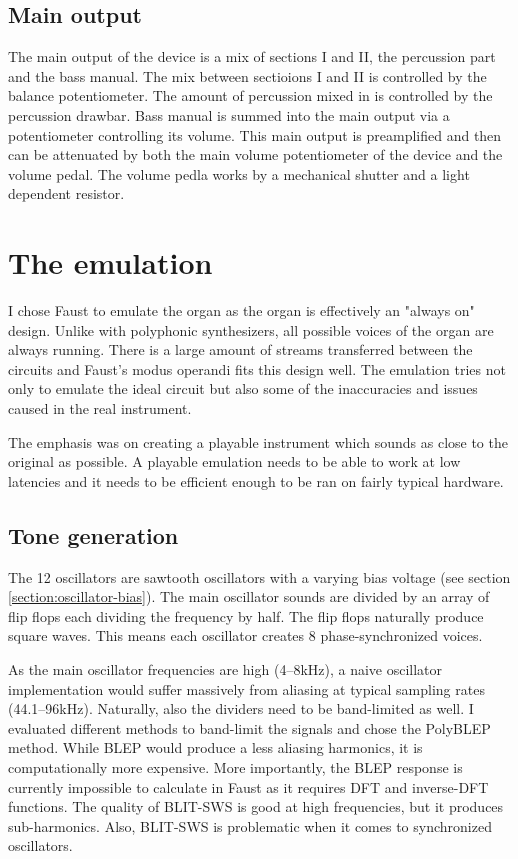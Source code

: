 \documentclass[11pt,a4paper]{article}
\begin{document}

\subsection{Main output}

The main output of the device is a mix of sections I and II, the percussion part and the bass manual. The mix between sectioions I and II is controlled by the balance potentiometer. The amount of percussion mixed in is controlled by the percussion drawbar. Bass manual is summed into the main output via a potentiometer controlling its volume. This main output is preamplified and then can be attenuated by both the main volume potentiometer of the device and the volume pedal. The volume pedla works by a mechanical shutter and a light dependent resistor.

\section{The emulation} 

I chose Faust to emulate the organ as the organ is effectively an "always on" design. Unlike with polyphonic synthesizers, all possible voices of the organ are always running. There is a large amount of streams transferred between the circuits and Faust's modus operandi fits this design well. The emulation tries not only to emulate the ideal circuit but also some of the inaccuracies and issues caused in the real instrument. 

The emphasis was on creating a playable instrument which sounds as close to the original as possible. A playable emulation needs to be able to work at low latencies and it needs to be efficient enough to be ran on fairly typical hardware.

\subsection{Tone generation}
\label{section:tone-generation}

The 12 oscillators are sawtooth oscillators with a varying bias voltage (see section \ref{section:oscillator-bias}). The main oscillator sounds are divided by an array of flip flops each dividing the frequency by half. The flip flops naturally produce square waves. This means each oscillator creates 8 phase-synchronized voices.

As the main oscillator frequencies are high (4--8kHz), a naive oscillator implementation would suffer massively from aliasing at typical sampling rates (44.1--96kHz). Naturally, also the dividers need to be band-limited as well. I evaluated different methods to band-limit the signals and chose the PolyBLEP\cite{antialiasing} method. While BLEP\cite{hardsync} would produce a less aliasing harmonics, it is computationally more expensive. More importantly, the BLEP response is currently impossible to calculate in Faust as it requires DFT and inverse-DFT functions. The quality of BLIT-SWS\cite{blit} is good at high frequencies, but it produces sub-harmonics\cite{antialiasing}. Also, BLIT-SWS is problematic when it comes to synchronized oscillators\cite{hardsync}.
\end{document}
